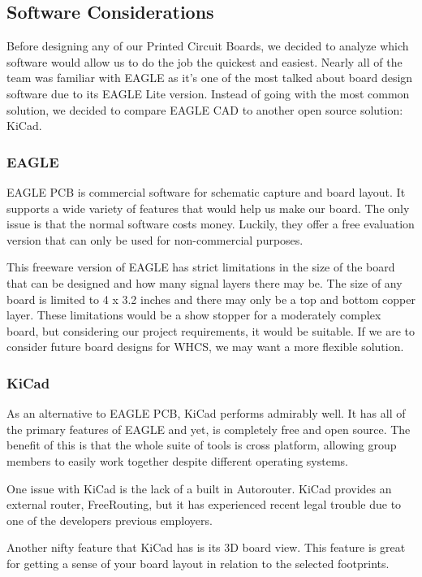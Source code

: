 
\subsection{Software Considerations}
Before designing any of our Printed Circuit Boards, we decided to analyze which
software would allow us to do the job the quickest and easiest. Nearly all of
the team was familiar with EAGLE as it's one of the most talked about board
design software due to its EAGLE Lite version. Instead of going with the most
common solution, we decided to compare EAGLE CAD to another open source
solution: KiCad.

\subsubsection{EAGLE}
EAGLE PCB is commercial software for schematic capture and board layout. It
supports a wide variety of features that would help us make our board. The only
issue is that the normal software costs money. Luckily, they offer a free
evaluation version that can only be used for non-commercial purposes.

This freeware version of EAGLE has strict limitations in the size of the board
that can be designed and how many signal layers there may be. The size of any
board is limited to 4 x 3.2
inches\cite{link17} and
there may only be a top and bottom copper layer. These limitations would be a
show stopper for a moderately complex board, but considering our project
requirements, it would be suitable.  If we are to consider future board designs
for WHCS, we may want a more flexible solution.

\subsubsection{KiCad}
As an alternative to EAGLE PCB, KiCad performs admirably well. It has all of
the primary features of EAGLE and yet, is completely free and open source. The benefit of this is that the whole suite of tools is cross platform, allowing group members to easily work together despite different operating systems.

One issue with KiCad is the lack of a built in Autorouter. KiCad provides an external router, FreeRouting\cite{link18}, but it has experienced recent legal trouble due to one of the developers previous employers.

Another nifty feature that KiCad has is its 3D board view. This feature is great for getting a sense of your board layout in relation to the selected footprints.
